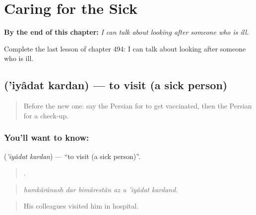 
\chapter{Caring for the Sick}
\label{ch:fa-caring-for-the-sick}

\begin{chapteropening}
\textbf{By the end of this chapter:} \emph{I can talk about looking after someone who is ill.}

Complete the last lesson of chapter 494: I can talk about looking after someone who is ill.
\end{chapteropening}

\section[\texorpdfstring{\fa{عیادت} \fa{کردن} ('iyâdat kardan)}{عیادت کردن ('iyâdat kardan)}]{  ('iyâdat kardan) — to visit (a sick person)}

\label{lesson:FA-C494-iyadat-kardan}



\begin{quote}
Before the new one: say the Persian for to get vaccinated, then the Persian for a check-up.
\end{quote}

\subsection*{You'll want to know:  }
\textbf{ } (\emph{'iyâdat kardan}) — \textquotedblleft{}to visit (a sick person)\textquotedblright{}.

\begin{quote}
      .
\end{quote}

\begin{quote}
\emph{hamkârânash dar bimârestân az u 'iyâdat kardand.}
\end{quote}

\begin{quote}
His colleagues visited him in hospital.
\end{quote}

